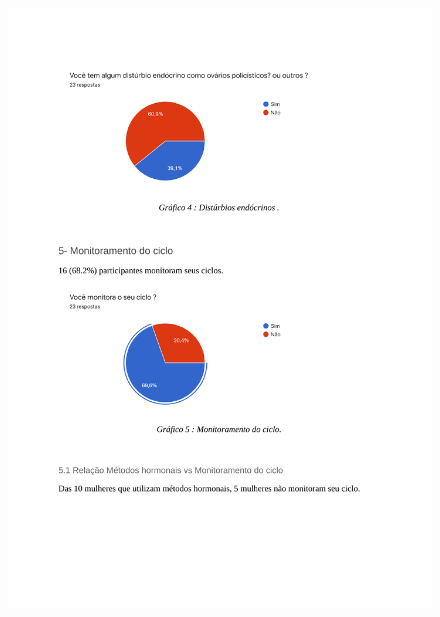 \begin{apendicesenv}
    \begin{figure}[h]
        \centering
        \includegraphics[keepaspectratio=true,scale=0.7]{figuras/Tab4.pdf}
    \end{figure}
    

\end{apendicesenv}
